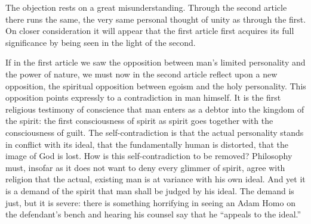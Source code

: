 \documentclass[12pt]{book}
\begin{document}
The objection rests on a great misunderstanding. Through the second
article there runs the same, the very same personal thought of unity as
through the first. On closer consideration it will appear that the
first article first acquires its full significance by being seen in the
light of the second.

If in the first article we saw the opposition between man's limited
personality and the power of nature, we must now in the second article
reflect upon a new opposition, the spiritual opposition between egoism
and the holy personality. This opposition points expressly to a
contradiction in man himself. It is the first religious testimony of
conscience that man enters as a debtor into the kingdom of the spirit:
the first consciousness of spirit as spirit goes together with the
consciousness of guilt. The self-contradiction is that the actual
personality stands in conflict with its ideal, that the fundamentally
human is distorted, that the image of God is lost. How is this
self-contradiction to be removed? Philosophy must, insofar as it does
not want to deny every glimmer of spirit, agree with religion that the
actual, existing man is at variance with his own ideal. And yet it is a
demand of the spirit that man shall be judged by his ideal. The demand
is just, but it is severe: there is something horrifying in seeing an
Adam Homo on the defendant's bench and hearing his counsel say that he
``appeals to the ideal.''
\end{document}
